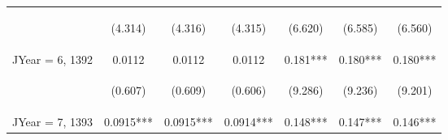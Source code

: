 \documentclass[]{article}
\begin{document}
\begin{center}
\begin{tabular}{lcccccc}
        \vspace{4pt}     & \begin{footnotesize}(4.314)\end{footnotesize}  & \begin{footnotesize}(4.316)\end{footnotesize}  & \begin{footnotesize}(4.315)\end{footnotesize}  & \begin{footnotesize}(6.620)\end{footnotesize}   & \begin{footnotesize}(6.585)\end{footnotesize}  & \begin{footnotesize}(6.560)\end{footnotesize}  \\
        JYear = 6, 1392  & 0.0112                                         & 0.0112                                         & 0.0112                                         & 0.181***                                        & 0.180***                                       & 0.180***                                       \\
        \vspace{4pt}     & \begin{footnotesize}(0.607)\end{footnotesize}  & \begin{footnotesize}(0.609)\end{footnotesize}  & \begin{footnotesize}(0.606)\end{footnotesize}  & \begin{footnotesize}(9.286)\end{footnotesize}   & \begin{footnotesize}(9.236)\end{footnotesize}  & \begin{footnotesize}(9.201)\end{footnotesize}  \\
        JYear = 7, 1393  & 0.0915***                                      & 0.0915***                                      & 0.0914***                                      & 0.148***                                        & 0.147***                                       & 0.146***                                       \\

\end{tabular}
\end{center}
\end{document}
